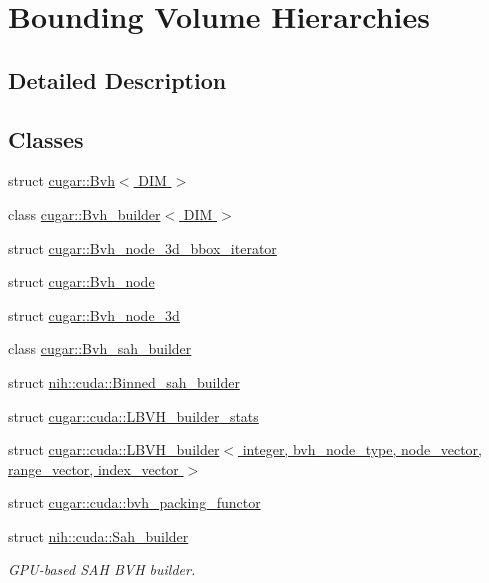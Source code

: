 \hypertarget{group__bvh}{}\section{Bounding Volume Hierarchies}
\label{group__bvh}


\subsection{Detailed Description}
\subsection*{Classes}
\begin{DoxyCompactItemize}
\item 
struct \hyperlink{structcugar_1_1_bvh}{cugar\+::\+Bvh$<$ D\+I\+M $>$}
\item 
class \hyperlink{classcugar_1_1_bvh__builder}{cugar\+::\+Bvh\+\_\+builder$<$ D\+I\+M $>$}
\item 
struct \hyperlink{structcugar_1_1_bvh__node__3d__bbox__iterator}{cugar\+::\+Bvh\+\_\+node\+\_\+3d\+\_\+bbox\+\_\+iterator}
\item 
struct \hyperlink{structcugar_1_1_bvh__node}{cugar\+::\+Bvh\+\_\+node}
\item 
struct \hyperlink{structcugar_1_1_bvh__node__3d}{cugar\+::\+Bvh\+\_\+node\+\_\+3d}
\item 
class \hyperlink{classcugar_1_1_bvh__sah__builder}{cugar\+::\+Bvh\+\_\+sah\+\_\+builder}
\item 
struct \hyperlink{structnih_1_1cuda_1_1_binned__sah__builder}{nih\+::cuda\+::\+Binned\+\_\+sah\+\_\+builder}
\item 
struct \hyperlink{structcugar_1_1cuda_1_1_l_b_v_h__builder__stats}{cugar\+::cuda\+::\+L\+B\+V\+H\+\_\+builder\+\_\+stats}
\item 
struct \hyperlink{structcugar_1_1cuda_1_1_l_b_v_h__builder}{cugar\+::cuda\+::\+L\+B\+V\+H\+\_\+builder$<$ integer, bvh\+\_\+node\+\_\+type, node\+\_\+vector, range\+\_\+vector, index\+\_\+vector $>$}
\item 
struct \hyperlink{structcugar_1_1cuda_1_1bvh__packing__functor}{cugar\+::cuda\+::bvh\+\_\+packing\+\_\+functor}
\item 
struct \hyperlink{structnih_1_1cuda_1_1_sah__builder}{nih\+::cuda\+::\+Sah\+\_\+builder}
\begin{DoxyCompactList}\small\item\em G\+P\+U-\/based S\+AH B\+VH builder. \end{DoxyCompactList}\end{DoxyCompactItemize}
